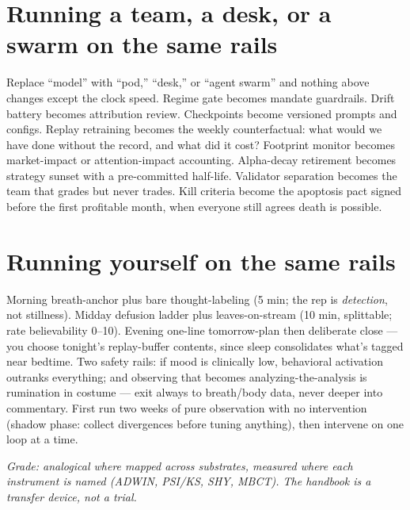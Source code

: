 \section{Running a team, a desk, or a swarm on the same rails}

Replace ``model'' with ``pod,'' ``desk,'' or ``agent swarm'' and nothing above changes except the clock speed. Regime gate becomes mandate guardrails. Drift battery becomes attribution review. Checkpoints become versioned prompts and configs. Replay retraining becomes the weekly counterfactual: what would we have done without the record, and what did it cost? Footprint monitor becomes market-impact or attention-impact accounting. Alpha-decay retirement becomes strategy sunset with a pre-committed half-life. Validator separation becomes the team that grades but never trades. Kill criteria become the apoptosis pact signed before the first profitable month, when everyone still agrees death is possible.

\section{Running yourself on the same rails}

Morning breath-anchor plus bare thought-labeling (5 min; the rep is \textit{detection}, not stillness). Midday defusion ladder plus leaves-on-stream (10 min, splittable; rate believability 0--10). Evening one-line tomorrow-plan then deliberate close --- you choose tonight's replay-buffer contents, since sleep consolidates what's tagged near bedtime. Two safety rails: if mood is clinically low, behavioral activation outranks everything; and observing that becomes analyzing-the-analysis is rumination in costume --- exit always to breath/body data, never deeper into commentary. First run two weeks of pure observation with no intervention (shadow phase: collect divergences before tuning anything), then intervene on one loop at a time.

\textit{Grade: analogical where mapped across substrates, measured where each instrument is named (ADWIN, PSI/KS, SHY, MBCT). The handbook is a transfer device, not a trial.}
